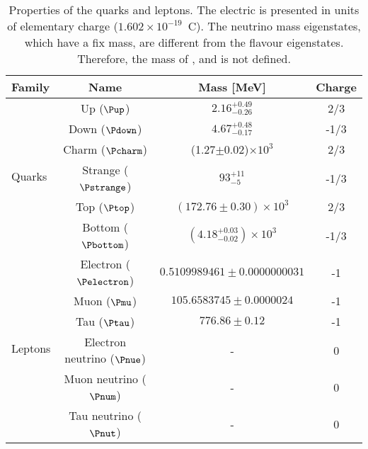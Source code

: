 \begin{table}[]
\centering
\begin{tabular}{lccc}
\toprule
Family                   		& Name              			& Mass [MeV]								& Charge    \\ \midrule
\multirow{6}{*}{Quarks} 	& Up 	 ($\Pup$)                	& $2.16^{+0.49}_{-0.26}$    					& 2/3  \\
                         			& Down     ($\Pdown$)            	& $4.67^{+0.48}_{-0.17}$	 		    			& -1/3  \\
                         			& Charm 	 ($\Pcharm$)            	& (1.27$\pm$0.02)$\times 10^{3}$					& 2/3  \\
                         			& Strange  ($\Pstrange$)          	& $93^{+11}_{-5}$     				& -1/3 \\
                         			& Top  	 ($\Ptop$)              	& $(172.76\pm0.30)\times 10^{3}$     				& 2/3 \\
                         			& Bottom   ($\Pbottom$)          	& $(4.18^{+0.03}_{-0.02})\times 10^{3}$     			& -1/3 \\ \midrule
\multirow{6}{*}{Leptons} 	& Electron  ($\Pelectron$)        	& $0.5109989461\pm0.0000000031$    	& -1   \\
                         			& Muon      ($\Pmu$)		        	& $105.6583745\pm0.0000024$     		& -1   \\
                         			& Tau          ($\Ptau$)     		& $776.86\pm0.12$					& -1   \\
                         			& Electron neutrino ($\Pnue$) 	&	-	& 0\\
                         			& Muon neutrino     ($\Pnum$)	&     	-	 & 0    \\
                         			& Tau neutrino        ($\Pnut$)  	&     	-	 & 0    \\ \bottomrule
\end{tabular}
\caption{Properties of the quarks and leptons. The electric is presented in units 
of elementary charge ($1.602 \times10^{-19}$~C). The neutrino mass eigenstates, which have a fix mass, are 
different from the flavour eigenstates. Therefore, the mass of \Pnue, \Pnum and \Pnut is not defined.}
\label{tab:Chap1:FundamentalFermions}
\end{table}



